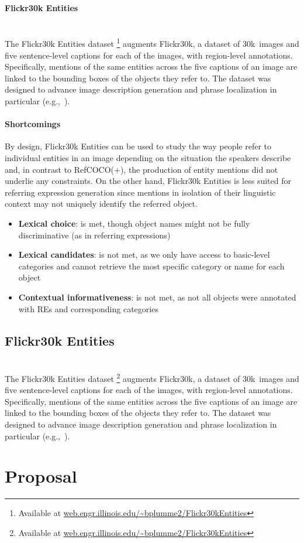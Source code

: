 \documentclass[runningheads]{llncs}
\newcommand{\refcoco}{RefCOCO\xspace}
\newcommand{\flickr}{Flickr30k Entities\xspace}
\begin{document}
\paragraph{Flickr30k Entities}~\\
The \flickr dataset \cite{plummer2015flickr30kentities}\footnote{Available at  \url{web.engr.illinois.edu/~bplumme2/Flickr30kEntities}}  augments Flickr30k, a dataset of 30k~images and five sentence-level captions for each of the images, with region-level annotations. 
Specifically, mentions of the same entities across the five captions of an image are linked to the bounding boxes of the objects they refer to. 
The dataset was designed to advance image description generation and phrase localization in particular (e.g.,~\cite{rohrbach2016grounding,plummer2017phrase,yeh2018unsupervised}). 

\paragraph{Shortcomings}

By design, \flickr can be used to study the way people refer to individual entities in an image depending on the situation the speakers describe and,  
in contrast to \refcoco(+), the production of entity mentions did not underlie any constraints. 
On the other hand, \flickr is less suited for referring expression generation since mentions in isolation of their linguistic context may not uniquely identify the referred object. 

\begin{itemize}
        \item[(1)] \textbf{Lexical choice}: is met, though object names might not be fully discriminative (as in referring expressions)
		\item[(2)] \textbf{Lexical candidates}: is not met, as we only have access to basic-level categories and cannot retrieve the  most specific category or name for each object
		\item[(3)] \textbf{Contextual informativeness}: is not met, as not all objects were annotated with REs and corresponding categories
\end{itemize}

\subsection{Flickr30k Entities}~\\
The \flickr dataset \cite{plummer2015flickr30kentities}\footnote{Available at  \url{web.engr.illinois.edu/~bplumme2/Flickr30kEntities}}  augments Flickr30k, a dataset of 30k~images and five sentence-level captions for each of the images, with region-level annotations. 
Specifically, mentions of the same entities across the five captions of an image are linked to the bounding boxes of the objects they refer to. 
The dataset was designed to advance image description generation and phrase localization in particular (e.g.,~\cite{rohrbach2016grounding,plummer2017phrase,yeh2018unsupervised}). 

\section{Proposal}
%


\clearpage


\end{document}
